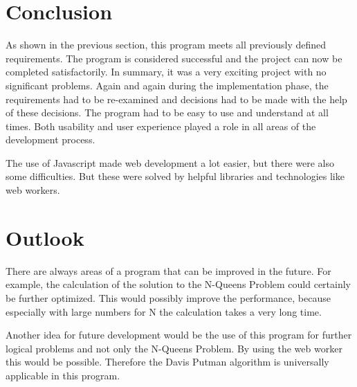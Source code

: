 \section{Conclusion}
\label{sec:proConclusion}
As shown in the previous section, this program meets all previously defined requirements. The program is considered successful and the project can now be completed satisfactorily. In summary, it was a very exciting project with no significant problems. Again and again during the implementation phase, the requirements had to be re-examined and decisions had to be made with the help of these decisions. The program had to be easy to use and understand at all times. Both usability and user experience played a role in all areas of the development process. 

The use of Javascript made web development a lot easier, but there were also some difficulties. But these were solved by helpful libraries and technologies like web workers. 

\section{Outlook}
\label{sec:proOutlook}
There are always areas of a program that can be improved in the future. For example, the calculation of the solution to the N-Queens Problem could certainly be further optimized. This would possibly improve the performance, because especially with large numbers for N the calculation takes a very long time. 

Another idea for future development would be the use of this program for further logical problems and not only the N-Queens Problem. By using the web worker this would be possible. Therefore the Davis Putman algorithm is universally applicable in this program.
